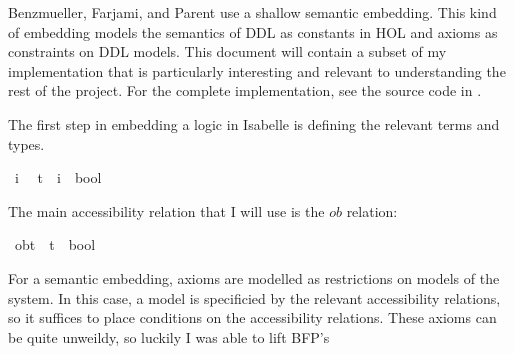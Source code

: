 \begin{isabellebody}
\begin{isamarkuptext}
Benzmueller, Farjami, and Parent use a shallow semantic embedding. This kind of embedding models the semantics of DDL as 
constants in HOL and axioms as constraints on DDL models. This document will contain a subset of my 
implementation that is particularly interesting and relevant to understanding the rest of the project. 
For the complete implementation, see the source code in .%
\end{isamarkuptext}\isamarkuptrue%
%
\isadelimdocument
%
\endisadelimdocument
%
\isatagdocument
%
\isamarkuptrue%
%
\endisatagdocument
{\isafolddocument}%
%
\isadelimdocument
%
\endisadelimdocument
%
\begin{isamarkuptext}%
The first step in embedding a logic in Isabelle is defining the relevant terms and types.%
\end{isamarkuptext}\isamarkuptrue%
\isamarkupfalse%
\ i\ %
\isanewline
\isanewline
{}\isamarkupfalse%
\ t\ {\isacharequal}\ {\isachardoublequoteopen}{\isacharparenleft}i\ {\isasymRightarrow}\ bool{\isacharparenright}{\isachardoublequoteclose}\ %
\isanewline
%
\isanewline
%
\begin{isamarkuptext}%
The main accessibility relation that I will use is the $ob$ relation:%
\end{isamarkuptext}\isamarkuptrue%
\isamarkupfalse%
\ ob{\isacharcolon}{\isacharcolon}{\isachardoublequoteopen}t\ {\isasymRightarrow}\ {\isacharparenleft}t\ {\isasymRightarrow}\ bool{\isacharparenright}{\isachardoublequoteclose}\ \ %
\isanewline
\ %
\isanewline
%
\isadelimdocument
%
\endisadelimdocument
%
\isatagdocument
%
\isamarkuptrue%
%
\endisatagdocument
{\isafolddocument}%
%
\isadelimdocument
%
\endisadelimdocument
%
\begin{isamarkuptext}%
For a semantic embedding, axioms are modelled as restrictions on models of the system. In this case,
a model is specificied by the relevant accessibility relations, so it suffices to place conditions on 
the accessibility relations. These axioms can be quite unweildy, so luckily I was able to lift BFP's 

\end{isamarkuptext}
\end{isabellebody}
